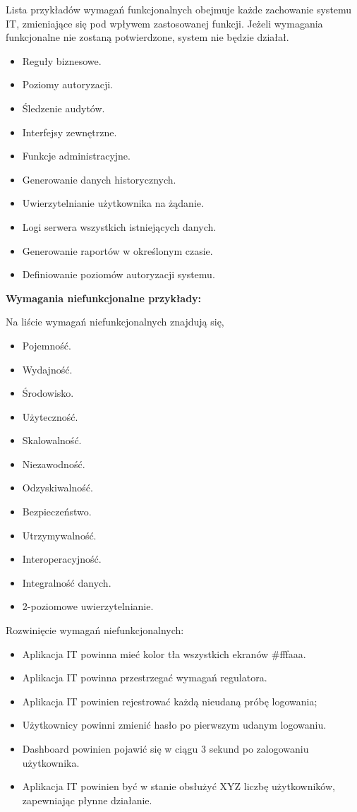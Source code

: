 Lista przykładów wymagań funkcjonalnych obejmuje każde zachowanie systemu IT, zmieniające się pod wpływem zastosowanej funkcji. Jeżeli wymagania funkcjonalne nie zostaną potwierdzone, system nie będzie działał.
\begin{itemize}
    \item Reguły biznesowe.
    \item Poziomy autoryzacji.
    \item  Śledzenie audytów.
    \item Interfejsy zewnętrzne.
    \item Funkcje administracyjne.
    \item Generowanie danych historycznych.
    \item Uwierzytelnianie użytkownika na żądanie.
    \item Logi serwera wszystkich istniejących danych.
    \item Generowanie raportów w określonym czasie.
    \item Definiowanie poziomów autoryzacji systemu.
\end{itemize}

\noindent \textbf{Wymagania niefunkcjonalne przykłady:}

\noindent Na liście wymagań niefunkcjonalnych znajdują się,
\begin{itemize}
    \item Pojemność.
    \item Wydajność.
    \item Środowisko.
    \item Użyteczność.
    \item Skalowalność.
    \item  Niezawodność.
    \item Odzyskiwalność.
    \item Bezpieczeństwo.
    \item Utrzymywalność.
    \item Interoperacyjność.
    \item Integralność danych.
    \item  2-poziomowe uwierzytelnianie.
\end{itemize}

\noindent Rozwinięcie wymagań niefunkcjonalnych:
\begin{itemize}
    \item Aplikacja IT powinna mieć kolor tła wszystkich ekranów \#fffaaa.
    \item Aplikacja IT powinna przestrzegać wymagań regulatora.
    \item Aplikacja IT powinien rejestrować każdą nieudaną próbę logowania;
    \item Użytkownicy powinni zmienić hasło po pierwszym udanym logowaniu.
    \item  Dashboard powinien pojawić się w ciągu 3 sekund po zalogowaniu użytkownika.
    \item Aplikacja IT powinien być w stanie obsłużyć XYZ liczbę użytkowników, zapewniając płynne działanie.
\end{itemize}

